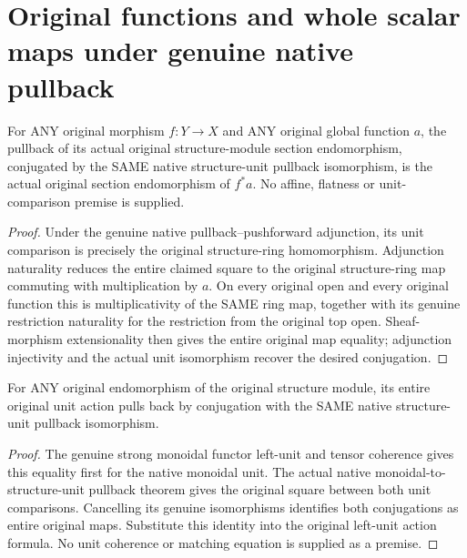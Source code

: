 \section{Original functions and whole scalar maps under genuine native pullback}
\label{sec:scheme-unit-scalar-action-base-change}

\begin{theorem}
\label{sc0-unit-scalar-base-change:unit-section}
\leanok
For ANY original morphism $f:Y\to X$ and ANY original global function $a$,
the pullback of its actual original structure-module section endomorphism,
conjugated by the SAME native structure-unit pullback isomorphism, is the
actual original section endomorphism of $f^*a$. No affine, flatness or
unit-comparison premise is supplied.
\end{theorem}
\begin{proof}
Under the genuine native pullback--pushforward adjunction, its unit
comparison is precisely the original structure-ring homomorphism.
Adjunction naturality reduces the entire claimed square to the original
structure-ring map commuting with multiplication by $a$. On every original
open and every original function this is multiplicativity of the SAME
ring map, together with its genuine restriction naturality for the
restriction from the original top open. Sheaf-morphism extensionality
then gives the entire original map equality; adjunction injectivity and
the actual unit isomorphism recover the desired conjugation.
\end{proof}

\begin{theorem}
\label{sc0-unit-scalar-base-change:whole-unit-action}
\leanok
For ANY original endomorphism of the original structure module, its
entire original unit action pulls back by conjugation with the SAME
native structure-unit pullback isomorphism.
\end{theorem}
\begin{proof}
The genuine strong monoidal functor left-unit and tensor coherence gives
this equality first for the native monoidal unit. The actual native
monoidal-to-structure-unit pullback theorem gives the original square
between both unit comparisons. Cancelling its genuine isomorphisms
identifies both conjugations as entire original maps. Substitute this
identity into the original left-unit action formula. No unit coherence
or matching equation is supplied as a premise.
\end{proof}

